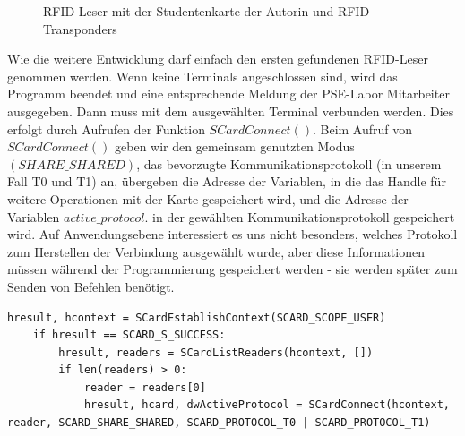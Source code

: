 \begin{figure}
	\caption{RFID-Leser mit der Studentenkarte der Autorin und RFID-Transponders}
	\label{fig:baga_stud}
\end{figure} 
Wie die weitere Entwicklung darf einfach den ersten gefundenen RFID-Leser genommen werden. Wenn keine Terminals angeschlossen sind, wird das Programm beendet und eine entsprechende Meldung der PSE-Labor Mitarbeiter ausgegeben. Dann muss mit dem ausgewählten Terminal verbunden werden. Dies erfolgt durch Aufrufen der Funktion $SCardConnect()$. Beim Aufruf von $SCardConnect()$ geben wir den gemeinsam genutzten Modus $(SHARE\_SHARED)$, das bevorzugte Kommunikationsprotokoll (in unserem Fall T0 und T1) an, übergeben die Adresse der Variablen, in die das Handle für weitere Operationen mit der Karte gespeichert wird, und die Adresse der Variablen $active\_protocol$. in der gewählten Kommunikationsprotokoll gespeichert wird. Auf Anwendungsebene interessiert es uns nicht besonders, welches Protokoll zum Herstellen der Verbindung ausgewählt wurde, aber diese Informationen müssen während der Programmierung gespeichert werden - sie werden später zum Senden von Befehlen benötigt\cite[p. 104]{chirico:smart_card}.
\begin{lstlisting}
hresult, hcontext = SCardEstablishContext(SCARD_SCOPE_USER)
	if hresult == SCARD_S_SUCCESS:
		hresult, readers = SCardListReaders(hcontext, [])
		if len(readers) > 0:
			reader = readers[0]
			hresult, hcard, dwActiveProtocol = SCardConnect(hcontext, reader, SCARD_SHARE_SHARED, SCARD_PROTOCOL_T0 | SCARD_PROTOCOL_T1)
\end{lstlisting}

